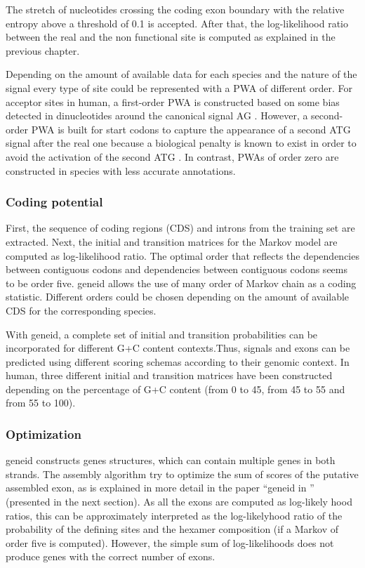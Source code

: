 The stretch of nucleotides crossing the coding exon boundary with the
relative entropy above a threshold of 0.1 is accepted. After that,
the log-likelihood ratio between the real and the non functional site 
is computed as explained in the previous chapter.

Depending on the amount of available data for each species and the
nature of the signal every type of site could be represented with a
PWA of different order. For acceptor sites in human, a first-order PWA
is constructed based on some bias detected in dinucleotides around the
canonical signal AG \cite{burge:1997a}. However, a second-order PWA is
built for start codons to capture the appearance of a second ATG
signal after the real one because a biological penalty is known to
exist in order to avoid the activation of the second ATG
\cite{kozak:1999a}. In contrast, PWAs of order zero are constructed in
species with less accurate annotations.

\subsubsection{Coding potential}

First, the sequence of coding regions (CDS) and introns from the
training set are extracted. Next, the initial and transition matrices
for the Markov model are computed as log-likelihood ratio. The optimal
order that reflects the dependencies between contiguous codons and
dependencies between contiguous codons seems to be order five.  geneid
allows the use of many order of Markov chain as a coding
statistic. Different orders could be chosen depending on the amount of
available CDS for the corresponding species.

With geneid, a complete set of initial and transition probabilities
can be incorporated for different G+C content contexts.Thus, signals
and exons can be predicted using different scoring schemas according
to their genomic context.  In human, three different initial and
transition matrices have been constructed depending on the percentage
of G+C content (from 0 to 45, from 45 to 55 and from 55 to 100).

\subsubsection{Optimization}


geneid constructs genes structures, which can contain multiple genes
in both strands. The assembly algorithm try to optimize the sum of
scores of the putative assembled exon, as is explained in more detail
in the paper ``geneid in \Droso'' (presented in the next section). As
all the exons are computed as log-likely hood ratios, this can be
approximately interpreted as the log-likelyhood ratio of the
probability of the defining sites and the hexamer composition (if a
Markov of order five is computed). However, the simple sum of
log-likelihoods does not produce genes with the correct number of
exons. 

